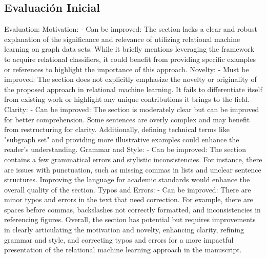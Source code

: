 \documentclass{article}%
\begin{document}
\subsection{Evaluación Inicial}%
\label{subsec:EvaluacinInicial}%
Evaluation:\newline%
\newline%
Motivation:\newline%
{-} Can be improved: The section lacks a clear and robust explanation of the significance and relevance of utilizing relational machine learning on graph data sets. While it briefly mentions leveraging the framework to acquire relational classifiers, it could benefit from providing specific examples or references to highlight the importance of this approach.\newline%
\newline%
Novelty:\newline%
{-} Must be improved: The section does not explicitly emphasize the novelty or originality of the proposed approach in relational machine learning. It fails to differentiate itself from existing work or highlight any unique contributions it brings to the field.\newline%
\newline%
Clarity:\newline%
{-} Can be improved: The section is moderately clear but can be improved for better comprehension. Some sentences are overly complex and may benefit from restructuring for clarity. Additionally, defining technical terms like "subgraph set" and providing more illustrative examples could enhance the reader's understanding.\newline%
\newline%
Grammar and Style:\newline%
{-} Can be improved: The section contains a few grammatical errors and stylistic inconsistencies. For instance, there are issues with punctuation, such as missing commas in lists and unclear sentence structures. Improving the language for academic standards would enhance the overall quality of the section.\newline%
\newline%
Typos and Errors:\newline%
{-} Can be improved: There are minor typos and errors in the text that need correction. For example, there are spaces before commas, backslashes not correctly formatted, and inconsistencies in referencing figures.\newline%
\newline%
Overall, the section has potential but requires improvements in clearly articulating the motivation and novelty, enhancing clarity, refining grammar and style, and correcting typos and errors for a more impactful presentation of the relational machine learning approach in the manuscript.
\end{document}
